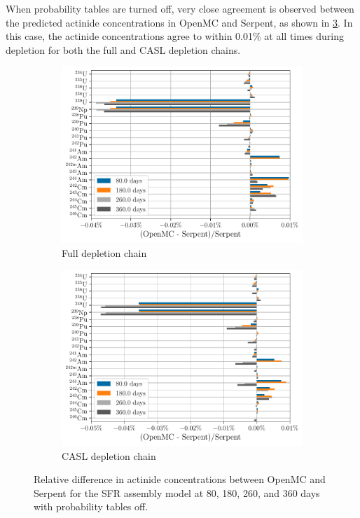 \documentclass[3p,authoryear]{elsarticle}
\begin{document}
When probability tables are turned off, very close agreement is observed between
the predicted actinide concentrations in OpenMC and Serpent, as shown in
\cref{fig:sfr-actinides-nop}. In this case, the actinide concentrations agree to
within 0.01\% at all times during depletion for both the full and CASL depletion
chains.
\begin{figure}[H]
  \centering
  \begin{subfigure}[t]{0.45\textwidth}
    \includegraphics[width=\textwidth]{figures/sfr_actinides_full_nop.pdf}
    \caption{Full depletion chain}
    \label{fig:sfr-actinides-full-nop}
  \end{subfigure}
  \hspace{0.05\textwidth}
  \begin{subfigure}[t]{0.45\textwidth}
    \includegraphics[width=\textwidth]{figures/sfr_actinides_casl_nop.pdf}
    \caption{CASL depletion chain}
    \label{fig:sfr-actinides-casl-nop}
  \end{subfigure}
  \caption{Relative difference in actinide concentrations between OpenMC and
  Serpent for the SFR assembly model at 80, 180, 260, and 360 days with
  probability tables off.}
  \label{fig:sfr-actinides-nop}
\end{figure}
\end{document}
